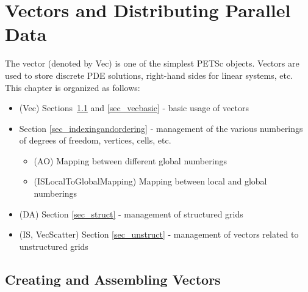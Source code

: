 %
%

\cleardoublepage
\chapter{Vectors and Distributing Parallel Data} 
\label{chapter_vectors}

The vector (denoted by Vec) is one of the simplest PETSc
objects.  Vectors are used to store discrete PDE solutions, right-hand
sides for linear systems, etc. This chapter is organized as follows:

\begin{itemize}
\item (Vec) Sections~\ref{sec_veccreate} and \ref{sec_vecbasic} - basic usage of vectors
\item Section \ref{sec_indexingandordering} - management of the various numberings of
               degrees of freedom, vertices, cells, etc.
  \begin{itemize} 
  \item (AO) Mapping between different global numberings
  \item (ISLocalToGlobalMapping) Mapping between local and global numberings
  \end{itemize}
\item (DA) Section \ref{sec_struct} - management of structured grids
\item (IS, VecScatter) Section \ref{sec_unstruct} - management of vectors related to 
      unstructured grids
\end{itemize}

\section{Creating and Assembling Vectors}
\label{sec_veccreate}

